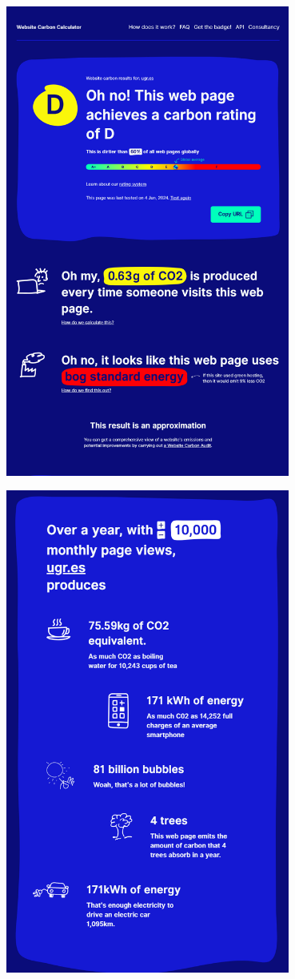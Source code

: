 \documentclass[12pt,a4paper]{report}
\begin{document}
\begin{center}
  \includegraphics[width=0.7\textwidth]{imagenes/WCC_2.png}
\end{center}

\begin{center}
  \includegraphics[width=0.7\textwidth]{imagenes/WCC_3.png}
\end{center}
\end{document}
